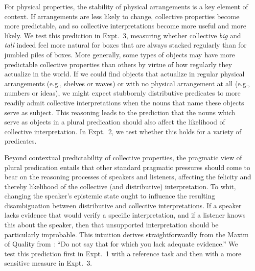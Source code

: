 \documentclass[preprint,12pt,authoryear,titlepage]{elsarticle}
\newcommand{\ndg}[1]{\textcolor{Green}{[ndg: #1]}}
\newcommand{\gcs}[1]{\textcolor{blue}{[gcs: #1]}}
\begin{document}
For physical properties, the stability of physical arrangements is a key element of context. If arrangements are less likely to change, collective properties become more predictable, and so collective interpretations become more useful and more likely. 
We test this prediction in Expt.~3, measuring whether collective \emph{big} and \emph{tall} indeed feel more natural for boxes that are always stacked regularly than for jumbled piles of boxes.
More generally, some types of objects may have more predictable collective properties than others by virtue of how regularly they actualize in the world.  If we could find objects that actualize in regular physical arrangements (e.g., shelves or waves) or with no physical arrangement at all (e.g., numbers or ideas), we might expect stubbornly distributive predicates to more readily admit collective interpretations when the nouns that name these objects serve as subject.
This reasoning leads to the prediction that the nouns which serve as objects in a plural predication should also affect the likelihood of collective interpretation. %
In Expt.~2, we test whether this holds for a variety of predicates.

Beyond contextual predictability of collective properties, the pragmatic view of plural predication entails that other standard pragmatic pressures should come to bear on the reasoning processes of speakers and listeners, affecting the felicity and thereby likelihood of the collective (and distributive) interpretation.
To whit, changing the speaker's epistemic state ought to influence the resulting disambiguation between distributive and collective interpretations. 
If a speaker lacks evidence that would verify a specific interpretation, and if a listener knows this about the speaker, then that unsupported interpretation should be particularly improbable. This intuition derives straightforwardly from the Maxim of Quality from \cite{grice1975}: ``Do not say that for which you lack adequate evidence.'' 
We test this prediction first in Expt.~1 with a reference task and then with a more sensitive measure in Expt.~3.

\end{document}
